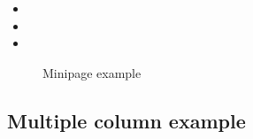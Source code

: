 \documentclass{article}
\begin{document}
\lipsum[1][1-3]
\notebox{\the\linewidth\ \the\textwidth\ \the\aweboxlinewidthvar\
  \the\aweboxleftmargin\ \the\aweboxcontentwidth\ \lipsum[1][3-6]}
\lipsum[1][6-9]

\begin{itemize}
\item \lipsum[2][1-3]
\item \lipsum[2][3-6]\notebox{\the\linewidth\ \the\textwidth\
    \the\aweboxlinewidthvar\ \the\aweboxleftmargin\
    \the\aweboxcontentwidth\ \lipsum[2][6-9]}
\item \lipsum[2][9-12]
\end{itemize}

\lipsum[3][1-3]
\notebox{\the\linewidth\ \the\textwidth\ \the\aweboxlinewidthvar\
  \the\aweboxleftmargin\ \the\aweboxcontentwidth\ \lipsum[3][3-6]}
\lipsum[3][6-9]

\begin{figure}
  \centering
  \caption{Minipage example}
  \label{fig:minipageex}
\end{figure}

\clearpage

\begin{multicols}{2}
  \section{Multiple column example}
  \lipsum[1]
  \notebox{\lipsum[2][1-3]\\
    & \the\linewidth\ \the\textwidth\\
    & \the\aweboxlinewidthvar\ \the\aweboxleftmargin\\
    & \the\aweboxcontentwidth}
  \lipsum[3-7]
\end{multicols}
\end{document}
